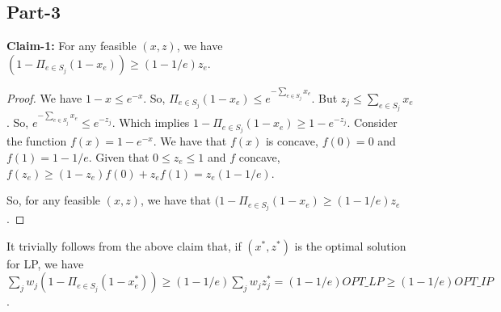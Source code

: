 \documentclass{article}
\begin{document}
\subsection{Part-3}
\textbf{Claim-1:} For any feasible $(x,z)$, we have $(1 - \Pi_{e \in S_j}(1- x_e)) \geq (1 - 1/e)z_e$.
\begin{proof}
We have $1 - x \leq e^{-x}$. So, $\Pi_{e \in S_j}(1 - x_e) \leq e^{-\sum_{e \in S_j}x_e}$. But $z_j \leq \sum_{e \in S_j}x_e$. So, $e^{-\sum_{e \in S_j}x_e} \leq e^{-z_j}$. Which implies $1 - \Pi_{e \in S_j}(1 - x_e) \geq 1 - e^{-z_j}$. Consider the function $f(x) = 1 - e^{-x}$. We have that $f(x)$ is concave, $f(0) = 0$ and $f(1) = 1-1/e$. Given that $0 \leq z_e \leq 1$ and $f$ concave, $f(z_e) \geq (1 - z_e)f(0) + z_ef(1) = z_e(1 - 1/e)$.

So, for any feasible $(x,z)$, we have that $(1 - \Pi_{e \in S_j}(1 - x_e) \geq (1-1/e)z_e$. 
\end{proof}
It trivially follows from the above claim that, if $(x^*,z^*)$ is the optimal solution for LP, we have $\sum_{j}w_j(1 - \Pi_{e \in S_j}(1-x^*_e)) \geq (1 - 1/e)\sum_{j}w_jz_j^* = (1-1/e)OPT\_LP \geq (1-1/e)OPT\_IP$.
\end{document}
